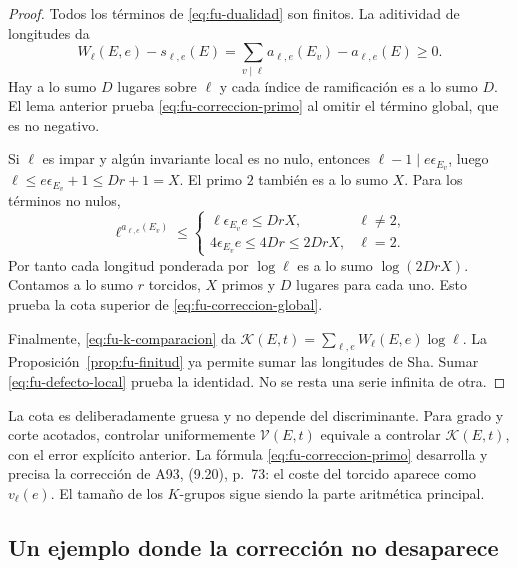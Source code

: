\begin{proof}
Todos los términos de \eqref{eq:fu-dualidad} son finitos.
La aditividad de longitudes da
\begin{equation}
 W_\ell(E,e)-s_{\ell,e}(E)
 =\sum_{v\mid\ell}a_{\ell,e}(E_v)-a_{\ell,e}(E)\ge0.
 \label{eq:fu-defecto-local}
\end{equation}
Hay a lo sumo $D$ lugares sobre $\ell$ y cada índice de ramificación
es a lo sumo $D$. El lema anterior prueba
\eqref{eq:fu-correccion-primo} al omitir el término global,
que es no negativo.

Si $\ell$ es impar y algún invariante local es no nulo, entonces
$\ell-1\mid e\epsilon_{E_v}$, luego
$\ell\le e\epsilon_{E_v}+1\le Dr+1=X$.
El primo $2$ también es a lo sumo $X$. Para los términos no nulos,
\[
 \ell^{a_{\ell,e}(E_v)}\le
 \begin{cases}
  \ell\epsilon_{E_v}e\le DrX,&\ell\ne2,\\
  4\epsilon_{E_v}e\le4Dr\le2DrX,&\ell=2.
 \end{cases}
\]
Por tanto cada longitud ponderada por $\log\ell$ es a lo sumo
$\log(2DrX)$. Contamos a lo sumo $r$ torcidos, $X$ primos
y $D$ lugares para cada uno. Esto prueba la cota superior
de \eqref{eq:fu-correccion-global}.

Finalmente, \eqref{eq:fu-k-comparacion} da
$\mathcal K(E,t)=\sum_{\ell,e}W_\ell(E,e)\log\ell$.
La Proposición~\ref{prop:fu-finitud} ya permite sumar las
longitudes de Sha. Sumar \eqref{eq:fu-defecto-local}
prueba la identidad. No se resta una serie infinita de otra.
\end{proof}

La cota es deliberadamente gruesa y no depende del discriminante.
Para grado y corte acotados, controlar uniformemente
$\mathcal V(E,t)$ equivale a controlar
$\mathcal K(E,t)$, con el error explícito anterior.
La fórmula \eqref{eq:fu-correccion-primo} desarrolla y precisa
la corrección de A93, (9.20), p.~73: el coste del torcido aparece
como $v_\ell(e)$. El tamaño de los $K$-grupos sigue siendo
la parte aritmética principal.

\subsection{Un ejemplo donde la corrección no desaparece}

